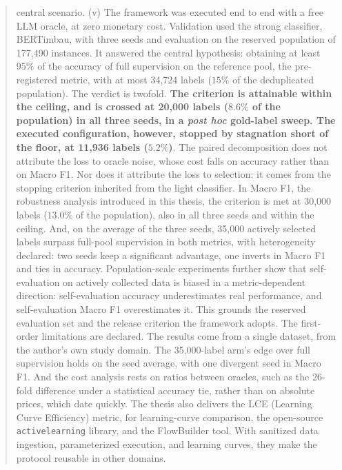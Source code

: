 \begin{abstract}
central scenario. (v) The framework was executed end to end with a free LLM oracle, at zero monetary cost. Validation used the strong classifier, BERTimbau, with three seeds and evaluation on the reserved population of 177,490 instances. It answered the central hypothesis: obtaining at least $95\%$ of the accuracy of full supervision on the reference pool, the pre-registered metric, with at most 34,724 labels ($15\%$ of the deduplicated population). The verdict is twofold. \textbf{The criterion is attainable within the ceiling, and is crossed at 20,000 labels ($8.6\%$ of the population) in all three seeds, in a \textit{post hoc} gold-label sweep. The executed configuration, however, stopped by stagnation short of the floor, at 11,936 labels ($5.2\%$)}. The paired decomposition does not attribute the loss to oracle noise, whose cost falls on accuracy rather than on Macro F1. Nor does it attribute the loss to selection: it comes from the stopping criterion inherited from the light classifier. In Macro F1, the robustness analysis introduced in this thesis, the criterion is met at 30,000 labels ($13.0\%$ of the population), also in all three seeds and within the ceiling. And, on the average of the three seeds, 35,000 actively selected labels surpass full-pool supervision in both metrics, with heterogeneity declared: two seeds keep a significant advantage, one inverts in Macro F1 and ties in accuracy. Population-scale experiments further show that self-evaluation on actively collected data is biased in a metric-dependent direction: self-evaluation accuracy underestimates real performance, and self-evaluation Macro F1 overestimates it. This grounds the reserved evaluation set and the release criterion the framework adopts. The first-order limitations are declared. The results come from a single dataset, from the author's own study domain. The 35,000-label arm's edge over full supervision holds on the seed average, with one divergent seed in Macro F1. And the cost analysis rests on ratios between oracles, such as the 26-fold difference under a statistical accuracy tie, rather than on absolute prices, which date quickly. The thesis also delivers the LCE (Learning Curve Efficiency) metric, for learning-curve comparison, the open-source \texttt{activelearning} library, and the FlowBuilder tool. With sanitized data ingestion, parameterized execution, and learning curves, they make the protocol reusable in other domains.

\end{abstract}
